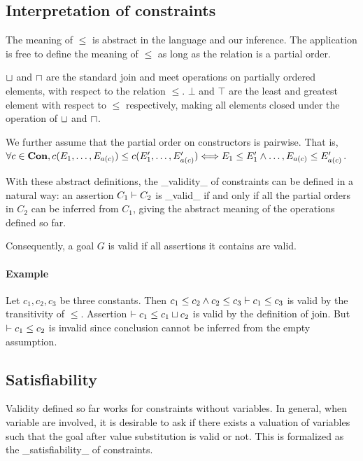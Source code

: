 \subsection{Interpretation of constraints}

The meaning of $\leq$ is abstract in the language and our inference. The
application is free to define the meaning of $\leq$ as long as the relation
is a partial order.

$\sqcup$ and $\sqcap$ are the standard join and meet operations on partially
ordered elements, with respect to the relation $\leq$. $\bot$ and $\top$ are
the least and greatest element with respect to $\leq$ respectively, making all
elements closed under the operation of $\sqcup$ and $\sqcap$.

We further assume that the partial order on constructors is pairwise. That is,
$\forall c\in \mathbf{Con}, c(E_1, \dots, E_{a(c)})\leq c(E_1', \dots, E_{a(c)}')
\Longleftrightarrow E_1\leq E_1' \land \dots, E_{a(c)}\leq E_{a(c)}'$.

With these abstract definitions, the _validity_ of constraints can be defined
in a natural way: an assertion $C_1 \vdash C_2$ is _valid_ if and only if all
the partial orders in $C_2$ can be inferred from $C_1$, giving the abstract
meaning of the operations defined so far.

Consequently, a goal $G$ is valid if all assertions it contains are valid.

\paragraph{Example}

Let $c_1, c_2, c_3$ be three constants. Then $c_1 \leq c_2 \land c_2 \leq c_3
\vdash c_1 \leq c_3$ is valid by the transitivity of $\leq$. Assertion $
\vdash c_1 \leq c_1 \sqcup c_2$ is valid by the definition of join. But
$\vdash c_1\leq c_2$ is invalid since conclusion cannot be inferred from the
empty assumption.

\subsection{Satisfiability}

Validity defined so far works for constraints without variables. In general,
when variable are involved, it is desirable to ask if there exists a valuation
of variables such that the goal after value substitution is valid or not. This
is formalized as the _satisfiability_ of constraints.

